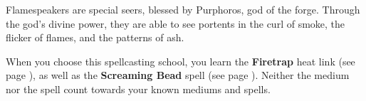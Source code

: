     Flamespeakers are special seers, blessed by Purphoros, god of the forge.
    Through the god's divine power, they are able to see portents in the curl of smoke, the flicker of flames, and the patterns of ash.

    When you choose this spellcasting school, you learn the \textbf{Firetrap} heat link (see page \pageref{medium::firetrap}), as well as the \textbf{Screaming Bead} spell (see page \pageref{spell::screamingbead}).
    Neither the medium nor the spell count towards your known mediums and spells.


